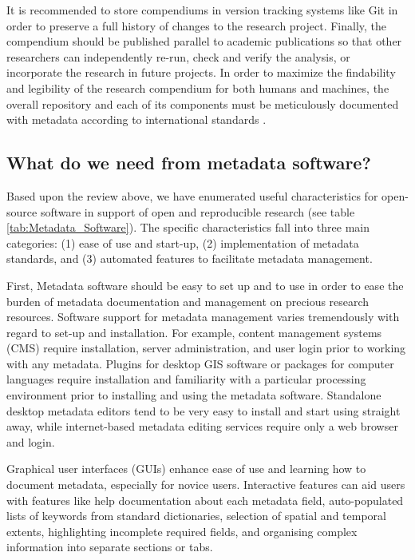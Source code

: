 \documentclass{isprs} %
\begin{document}
It is recommended to store compendiums in version tracking systems like Git in order to preserve a full history of changes to the research project.
Finally, the compendium should be published parallel to academic publications so that other researchers can independently re-run, check and verify the analysis, or incorporate the research in future projects.
In order to maximize the findability and legibility of the research compendium for both humans and machines, the overall repository and each of its components must be meticulously documented with metadata according to international standards \citep{Wilkinson2016,Wilson2021}.

\subsection{What do we need from metadata software?}\label{metadataneeds}

Based upon the review above, we have enumerated useful characteristics for open-source software in support of open and reproducible research (see table \ref{tab:Metadata_Software}).
The specific characteristics fall into three main categories: (1) ease of use and start-up, (2) implementation of metadata standards, and (3) automated features to facilitate metadata management.

First, Metadata software should be easy to set up and to use in order to ease the burden of metadata documentation and management on precious research resources.
Software support for metadata management varies tremendously with regard to set-up and installation.
For example, content management systems (CMS) require installation, server administration, and user login prior to working with any metadata. 
Plugins for desktop GIS software or packages for computer languages require installation and familiarity with a particular  processing environment prior to installing and using the metadata software. 
Standalone desktop metadata editors tend to be very easy to install and start using straight away, while internet-based metadata editing services require only a web browser and login.

Graphical user interfaces (GUIs) enhance ease of use and learning how to document metadata, especially for novice users.
Interactive features can aid users with features like help documentation about each metadata field, auto-populated lists of keywords from standard dictionaries, selection of spatial and temporal extents, highlighting incomplete required fields, and organising complex information into separate sections or tabs.
\end{document}
